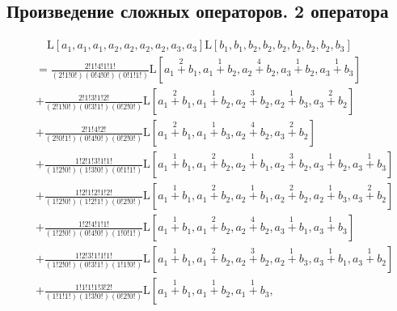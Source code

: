 
\subsection{Произведение сложных операторов. 2 оператора}

\begin{equation*} \begin{aligned}
& \quad
  \mathrm{L}[a_1, a_1, a_1, a_2, a_2, a_2, a_2, a_3, a_3] %
  \mathrm{L}[b_1, b_1, b_2, b_2, b_2, b_2, b_2, b_2, b_3] \\ &= %
  \frac{2!1!4!1!1!}{(2!1!0!)(0!4!0!)(0!1!1!)}
  \mathrm{L}\left[
  \stackrel{2}{a_1 + b_1},
  \stackrel{1}{a_1 + b_2},
  \stackrel{4}{a_2 + b_2},
  \stackrel{1}{a_3 + b_2},
  \stackrel{1}{a_3 + b_3}
  \right] \\ &
+ \frac{2!1!3!1!2!}{(2!1!0!)(0!3!1!)(0!2!0!)}
  \mathrm{L}\left[
  \stackrel{2}{a_1 + b_1},
  \stackrel{1}{a_1 + b_2},
  \stackrel{3}{a_2 + b_2},
  \stackrel{1}{a_2 + b_3},
  \stackrel{2}{a_3 + b_2}
  \right] \\ &
+ \frac{2!1!4!2!}{(2!0!1!)(0!4!0!)(0!2!0!)}
  \mathrm{L}\left[
  \stackrel{2}{a_1 + b_1},
  \stackrel{1}{a_1 + b_3},
  \stackrel{4}{a_2 + b_2},
  \stackrel{2}{a_3 + b_2}
  \right] \\ &
+ \frac{1!2!1!3!1!1!}{(1!2!0!)(1!3!0!)(0!1!1!)}
  \mathrm{L}\left[
  \stackrel{1}{a_1 + b_1},
  \stackrel{2}{a_1 + b_2},
  \stackrel{1}{a_2 + b_1},
  \stackrel{3}{a_2 + b_2},
  \stackrel{1}{a_3 + b_2},
  \stackrel{1}{a_3 + b_3}
  \right] \\ &
+ \frac{1!2!1!2!1!2!}{(1!2!0!)(1!2!1!)(0!2!0!)}
  \mathrm{L}\left[
  \stackrel{1}{a_1 + b_1},
  \stackrel{2}{a_1 + b_2},
  \stackrel{1}{a_2 + b_1},
  \stackrel{2}{a_2 + b_2},
  \stackrel{1}{a_2 + b_3},
  \stackrel{2}{a_3 + b_2}
  \right] \\ &
+ \frac{1!2!4!1!1!}{(1!2!0!)(0!4!0!)(1!0!1!)}
  \mathrm{L}\left[
  \stackrel{1}{a_1 + b_1},
  \stackrel{2}{a_1 + b_2},
  \stackrel{4}{a_2 + b_2},
  \stackrel{1}{a_3 + b_1},
  \stackrel{1}{a_3 + b_3}
  \right] \\ &
+ \frac{1!2!3!1!1!1!}{(1!2!0!)(0!3!1!)(1!1!0!)}
  \mathrm{L}\left[
  \stackrel{1}{a_1 + b_1},
  \stackrel{2}{a_1 + b_2},
  \stackrel{3}{a_2 + b_2},
  \stackrel{1}{a_2 + b_3},
  \stackrel{1}{a_3 + b_1},
  \stackrel{1}{a_3 + b_2}
  \right] \\ &
+ \frac{1!1!1!1!3!2!}{(1!1!1!)(1!3!0!)(0!2!0!)}
  \mathrm{L}\left[
  \stackrel{1}{a_1 + b_1},
  \stackrel{1}{a_1 + b_2},
  \stackrel{1}{a_1 + b_3},

\end{aligned}
\end{equation*}
